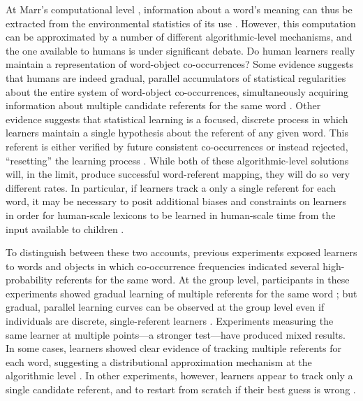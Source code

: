 \documentclass{pnastwo}
\begin{document}
\begin{article}
At Marr's computational level \citep{Marr1982}, information about a word's meaning can thus be extracted from the environmental statistics of its use \cite{Frank2009a}. However, this computation can be approximated by a number of different algorithmic-level mechanisms, and the one available to humans is under significant debate. Do human learners really maintain a representation of word-object co-occurrences? Some evidence suggests that humans are indeed gradual, parallel accumulators of statistical regularities about the entire system of word-object co-occurrences, simultaneously acquiring information about multiple candidate referents for the same word \citep{Vouloumanos2008, McMurray2012, Yurovsky2014}. Other evidence suggests that statistical learning is a focused, discrete process in which learners maintain a single hypothesis about the referent of any given word. This referent is either verified by future consistent co-occurrences or instead rejected, ``resetting'' the learning process \citep{Medina2011, Trueswell2013}. While both of these algorithmic-level solutions will, in the limit, produce successful word-referent mapping, they will do so very different rates. In particular, if learners track a only a single referent for each word, it may be necessary to posit additional biases and constraints on learners in order for human-scale lexicons to be learned in human-scale time from the input available to children \citep{Vogt2012, Reisenauer2013}.

To distinguish between these two accounts, previous experiments exposed learners to words and objects in which co-occurrence frequencies indicated several high-probability referents for the same word. At the group level, participants in these experiments showed gradual learning of multiple referents for the same word \citep[e.g.,][]{Vouloumanos2008, Yurovsky2013}; but gradual, parallel learning curves can be observed at the group level even if individuals are discrete, single-referent learners \citep{Gallistel2004, Medina2011}. Experiments measuring the same learner at multiple points---a stronger test---have produced mixed results. In some cases, learners showed clear evidence of tracking multiple referents for each word, suggesting a distributional approximation mechanism at the algorithmic level \citep{Smith2011a, Yurovsky2013a, Dautriche2014}. In other experiments, however, learners appear to track only a single candidate referent, and to restart from scratch if their best guess is wrong \citep{Medina2011, Trueswell2013}. 


\end{article}
\end{document}

